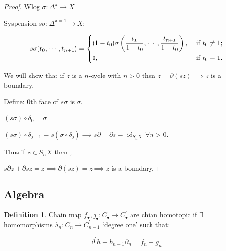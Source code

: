 \documentclass{article}
\theoremstyle{definition}
\newtheorem*{definition}{Definition}
\begin{document}
    \begin{proof}
        Wlog \(\sigma : \Delta^n \to X\).

        Syspension \(s \sigma : \Delta^{n=1} \to X\):

        \[
            s \sigma(t_0, \cdots , t_{n+1}) = \begin{dcases}
                (1-t_0) \sigma \left( \frac{t_1}{1-t_0}, \cdots , \frac{t_{n+1}}{1-t_0} \right), &\text{ if }  t_0 \neq 1 ;\\
                0, &\text{ if } t_0 = 1 .
            \end{dcases}
        \]


        We will show that if \(z\) is a \(n\)-cycle with \(n > 0\) then \(z = \partial (s z) \implies z\) is a boundary.

        Define: \(0\)th face of \(s \sigma\) is \(\sigma\).

        \((s \sigma) \circ \delta_0 = \sigma\)

        \((s \sigma) \circ \delta_{j+1} = s(\sigma \circ \delta_j) \implies s \partial + \partial s = \operatorname{id}_{S_n X} \, \forall n > 0\).

        Thus if \(z \in S_n X\) then ,

        \(s \partial z + \partial s z = z \implies \partial(sz) = z \implies z\) is a boundary.
    \end{proof}

    \subsection*{Algebra}

    \begin{definition}
        Chain map \(f_\bullet, g_\bullet: C_\bullet \to C_{\bullet}^{\prime}\) are \underline{chian} \underline{homotopic} if \(\exists\) homomorphisms \(h_n : C_n \to C_{n+1}
    ^{\prime}\)  `degree one' such that:

    \[
        \partial ^{\prime} h + h_{n-1} \partial _n = f_n - g_n
    \]

    \begin{center}
    \end{center}
    \end{definition}
\end{document}
